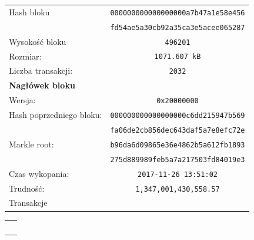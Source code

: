 \documentclass[12pt, twoside, final, openany]{mgr}
\begin{document}
\newpage
\begin{figure}[H]
	\begin{center}
  	\begin{tabular}{ | l  c | }
		\hline    
     	Hash bloku & \texttt{000000000000000000a7b47a1e58e456} \\
    			    & \texttt{fd54ae5a30cb92a35ca3e5acee065287} \\ 
    	Wysokość bloku & \texttt{496201} \\ 
    	Rozmiar: & \texttt{1071.607 kB} \\
   	 	Liczba transakcji: & \texttt{2032} \\ \hline
		\textbf{Nagłówek bloku}  &  \\  	 	
   	 	Wersja: & \texttt{0x20000000} \\   	 	
   	 	Hash poprzedniego bloku: &  \texttt{000000000000000000c6dd215947b569} \\
    							 &  \texttt{fa06de2cb856dec643daf5a7e8efc72e} \\ 
		Markle root: 			 & \texttt{b96da6d09865e36e4862b5a612fb1893} \\
								 & \texttt{275d889989feb5a7a217503fd84019e3} \\
   		Czas wykopania: & \texttt{2017-11-26 13:51:02} \\
   		Trudność: & \texttt{1,347,001,430,558.57}\\
   		\hline
   		Transakcje &\\
   		\hline 
 	\end{tabular}
	\end{center}
	
	\begin{center}
	\begin{tabular}{c} 
		\big\Downarrow\
	\end{tabular}
	\end{center}
	

\end{figure}
\end{document}
